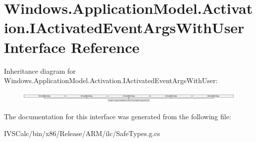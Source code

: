 \hypertarget{interface_windows_1_1_application_model_1_1_activation_1_1_i_activated_event_args_with_user}{}\section{Windows.\+Application\+Model.\+Activation.\+I\+Activated\+Event\+Args\+With\+User Interface Reference}
\label{interface_windows_1_1_application_model_1_1_activation_1_1_i_activated_event_args_with_user}
Inheritance diagram for Windows.\+Application\+Model.\+Activation.\+I\+Activated\+Event\+Args\+With\+User\+:\begin{figure}[H]
\begin{center}
\leavevmode
\includegraphics[height=0.558603cm]{interface_windows_1_1_application_model_1_1_activation_1_1_i_activated_event_args_with_user}
\end{center}
\end{figure}


The documentation for this interface was generated from the following file\+:\begin{DoxyCompactItemize}
\item 
I\+V\+S\+Calc/bin/x86/\+Release/\+A\+R\+M/ilc/Safe\+Types.\+g.\+cs\end{DoxyCompactItemize}
